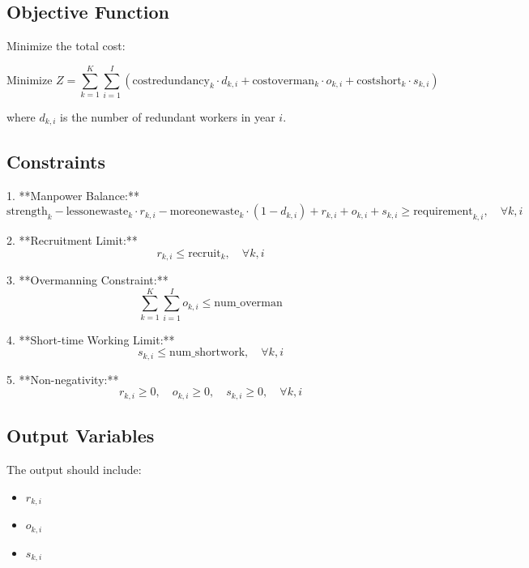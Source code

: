 \documentclass{article}
\begin{document}
\subsection*{Objective Function}

Minimize the total cost:

\[
\text{Minimize } Z = \sum_{k=1}^{K} \sum_{i=1}^{I} \left( \text{costredundancy}_{k} \cdot d_{k,i} + \text{costoverman}_{k} \cdot o_{k,i} + \text{costshort}_{k} \cdot s_{k,i} \right)
\]

where \( d_{k,i} \) is the number of redundant workers in year \( i \).

\subsection*{Constraints}

1. **Manpower Balance:**
   \[
   \text{strength}_{k} - \text{lessonewaste}_{k} \cdot r_{k,i} - \text{moreonewaste}_{k} \cdot (1 - d_{k,i}) + r_{k,i} + o_{k,i} + s_{k,i} \geq \text{requirement}_{k,i}, \quad \forall k, i
   \]

2. **Recruitment Limit:**
   \[
   r_{k,i} \leq \text{recruit}_{k}, \quad \forall k, i
   \]

3. **Overmanning Constraint:**
   \[
   \sum_{k=1}^{K} \sum_{i=1}^{I} o_{k,i} \leq \text{num\_overman}
   \]

4. **Short-time Working Limit:**
   \[
   s_{k,i} \leq \text{num\_shortwork}, \quad \forall k, i
   \]

5. **Non-negativity:**
   \[
   r_{k,i} \geq 0, \quad o_{k,i} \geq 0, \quad s_{k,i} \geq 0, \quad \forall k, i
   \]

\subsection*{Output Variables}

The output should include:
\begin{itemize}
    \item \( r_{k,i} \)
    \item \( o_{k,i} \)
    \item \( s_{k,i} \)
\end{itemize}
\end{document}
